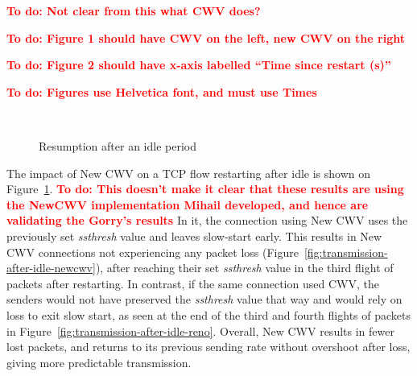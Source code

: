 \documentclass[10pt,sigconf,anonymous]{acmart}
\newcommand{\todo}[1]{\textbf{\textcolor{red}{To do: #1}}}
\begin{document}
\todo{Not clear from this what CWV does?}

\todo{Figure 1 should have CWV on the left, new CWV on the right}

\todo{Figure 2 should have x-axis labelled ``Time since restart (s)''}

\todo{Figures use Helvetica font, and must use Times}

\begin{figure}[t!]
  \centering
  \\
    \caption{Resumption after an idle period}
    \label{fig:transmission-after-idle}
\end{figure}

The impact of New CWV on a TCP flow restarting after idle is shown on Figure~\ref{fig:transmission-after-idle}. 
\todo{This doesn't make it clear that these results are using the NewCWV implementation Mihail developed, and hence are validating the Gorry's results}
In it, the connection using New CWV uses the previously set \emph{ssthresh} value and leaves slow-start early. This results in New CWV connections not experiencing any packet loss (Figure~\ref{fig:transmission-after-idle-newcwv}), after reaching their set \emph{ssthresh} value in the third flight of packets after restarting. In contrast, if the same connection used CWV, the senders would not have preserved the \emph{ssthresh} value that way and would rely on loss to exit slow start, as seen at the end of the third and fourth flights of packets in Figure~\ref{fig:transmission-after-idle-reno}. Overall, New CWV results in fewer lost packets, and returns to its previous sending rate without overshoot after loss, giving more predictable transmission.
\end{document}
